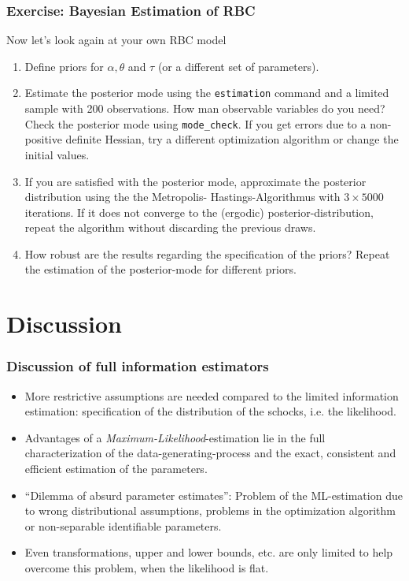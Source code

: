 \documentclass[handout]{beamer}  %
\begin{document}
\begin{frame}\frametitle{Exercise: Bayesian Estimation of RBC}
	Now let's look again at your own RBC model
	\begin{enumerate}
		\item Define priors for $\alpha,\theta$ and $\tau$ (or a different set of parameters).
		\item Estimate the posterior mode using the \texttt{estimation} command and a limited sample with 200 observations. How man observable variables do you need? Check the posterior mode using \texttt{mode\_check}. If you get errors due to a non-positive definite Hessian, try a different optimization algorithm or change the initial values.
		\item If you are satisfied with the posterior mode, approximate the posterior distribution using the the Metropolis- Hastings-Algorithmus with $3\times 5000$ iterations. If it does not converge to the (ergodic) posterior-distribution, repeat the algorithm without discarding the previous draws.
		\item How robust are the results regarding the specification of the priors? Repeat the estimation of the posterior-mode for different priors.		
	\end{enumerate}
\end{frame}

\section{Discussion}

\begin{frame}\frametitle{Discussion of full information estimators}
	\begin{itemize}
		\item More restrictive assumptions are needed compared to the limited information estimation: specification of the distribution of the schocks, i.e. the likelihood.
		\item Advantages of a \emph{Maximum-Likelihood}-estimation lie in the full characterization of the data-generating-process and the exact, consistent and efficient estimation of the parameters.
		\item \enquote{Dilemma of absurd parameter estimates}: Problem of the ML-estimation due to wrong distributional assumptions, problems in the optimization algorithm or non-separable identifiable parameters.
		\item Even transformations, upper and lower bounds, etc. are only limited to help overcome this problem, when the likelihood is flat.
	\end{itemize}
	
	
\end{frame}
\end{document}
